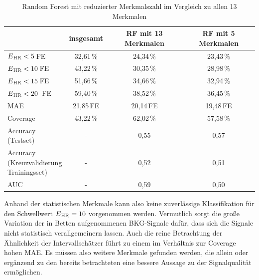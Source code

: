  \begin{table}[H]
 	\centering
  	\begin{tabular}{l || c | c | c}
 																& insgesamt 		& RF mit 13 Merkmalen			& RF mit 5 Merkmalen\\\hline
 		$E\textsubscript{HR} < 5$\,\si{FE} 						& 32{,}61\,\% 		& 24,34\,\%			& 23,43\,\%	\\
 		$E\textsubscript{HR} < 10$\,\si{FE} 						& 43{,}22\,\% 		& 30,35\,\% 		& 28,98\,\%	\\
 		$E\textsubscript{HR} < 15$\,\si{FE} 						& 51{,}66\,\% 		& 34,66\,\% 		& 32,94\,\%	\\
 		$E\textsubscript{HR} < 20$ \,\si{FE}						& 59{,}40\,\% 		& 38,52\,\% 		& 36,45\,\%\\\hline
 		MAE														& 21{,}85\,\si{FE}	& 20,14\,\si{FE}	& 19{,}48\,\si{FE}\\\hline
 		Coverage												& 43{,22}\,\%		& 62,02\,\%			& 57,58\,\%\\\hline
 		\makecell[l]{Accuracy\\(Testset)}						& -					& 0,55				& 0,57\\\hline
 		\makecell[l]{Accuracy\\(Kreuzvalidierung\\Trainingsset)}	& -					& 0{,}52			& 0,51\\\hline
 		AUC														& -					& 0,59				& 0,50
 	\end{tabular}
 	\caption{Random Forest mit reduzierter Merkmalszahl im Vergleich zu allen 13 Merkmalen}
 	\label{fig:ml-statistical-reduced-comparison}
 \end{table}

Anhand der statistischen Merkmale kann also keine zuverlässige Klassifikation für den Schwellwert $E\textsubscript{HR} = 10$ vorgenommen werden. Vermutlich sorgt die große Variation der in Betten aufgenommenen \ac{BKG}-Signale dafür, dass sich die Signale nicht statistisch verallgemeinern lassen. Auch die reine Betrachtung der Ähnlichkeit der Intervallschätzer führt zu einem im Verhältnis zur Coverage hohen \ac{MAE}. Es müssen also weitere Merkmale gefunden werden, die allein oder ergänzend zu den bereits betrachteten eine bessere Aussage zu der Signalqualität ermöglichen.

